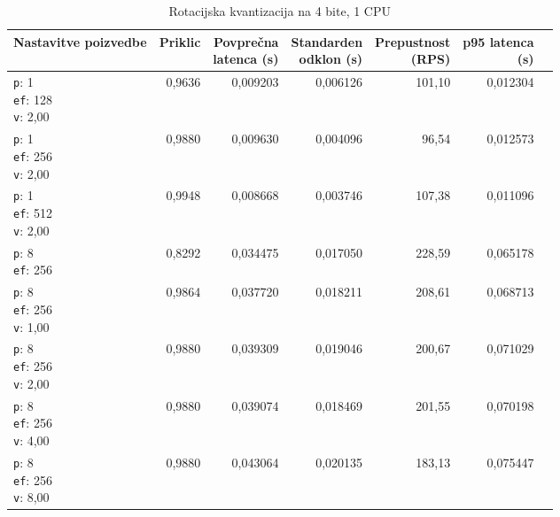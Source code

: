 \begin{table}[htbp]
  \centering
\small
  \caption{Rotacijska kvantizacija na 4 bite, 1 CPU}
  \label{tab:single-1cpu-4ram:tq4:qdrant-dipl-baseline-tenant-subgraph-tq4-ext-m16-ef-128-random-768-100-tenants-extended-upload-2026-08-18-09-41-34.json}
  \begin{tabularx}{\textwidth}{Xrrrrrr}
    \toprule
    Nastavitve poizvedbe & Priklic & \makecell{Povprečna\\latenca (s)} & \makecell{Standarden\\odklon (s)} & \makecell{Prepustnost\\(RPS)} & \makecell{p95 latenca\\(s)}  \\
    \midrule
    \makecell{\texttt{p}: 1\\\texttt{ef}: 128\\\texttt{v}: 2,00} & 0,9636 & 0,009203 & 0,006126 & 101,10 & 0,012304 \\
    \makecell{\texttt{p}: 1\\\texttt{ef}: 256\\\texttt{v}: 2,00} & 0,9880 & 0,009630 & 0,004096 & 96,54 & 0,012573 \\
    \makecell{\texttt{p}: 1\\\texttt{ef}: 512\\\texttt{v}: 2,00} & 0,9948 & 0,008668 & 0,003746 & 107,38 & 0,011096 \\
    \makecell{\texttt{p}: 8\\\texttt{ef}: 256} & 0,8292 & 0,034475 & 0,017050 & 228,59 & 0,065178 \\
    \makecell{\texttt{p}: 8\\\texttt{ef}: 256\\\texttt{v}: 1,00} & 0,9864 & 0,037720 & 0,018211 & 208,61 & 0,068713 \\
    \makecell{\texttt{p}: 8\\\texttt{ef}: 256\\\texttt{v}: 2,00} & 0,9880 & 0,039309 & 0,019046 & 200,67 & 0,071029 \\
    \makecell{\texttt{p}: 8\\\texttt{ef}: 256\\\texttt{v}: 4,00} & 0,9880 & 0,039074 & 0,018469 & 201,55 & 0,070198 \\
    \makecell{\texttt{p}: 8\\\texttt{ef}: 256\\\texttt{v}: 8,00} & 0,9880 & 0,043064 & 0,020135 & 183,13 & 0,075447 \\

\end{tabularx}
\end{table}
